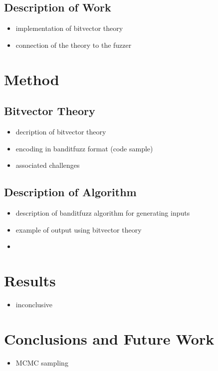 \documentclass[article,11pt]{article}
\begin{document}
\subsection*{Description of Work}
\label{sec:orgecfedee}
\begin{itemize}
\item implementation of bitvector theory\\
\item connection of the theory to the fuzzer\\
\end{itemize}

\section*{Method}
\label{sec:org54dbdbd}
\subsection*{Bitvector Theory}
\label{sec:org27fcce0}
\begin{itemize}
\item decription of bitvector theory\\
\item encoding in banditfuzz format (code sample)\\
\item associated challenges\\
\end{itemize}
\subsection*{Description of Algorithm}
\label{sec:org121b0b6}
\begin{itemize}
\item description of banditfuzz algorithm for generating inputs\\
\item example of output using bitvector theory\\
\item 
\end{itemize}
\section*{Results}
\label{sec:org8664552}
\begin{itemize}
\item inconclusive\\
\end{itemize}
\section*{Conclusions and Future Work}
\label{sec:org04f949f}
\begin{itemize}
\item MCMC sampling\\
\end{itemize}
\end{document}
